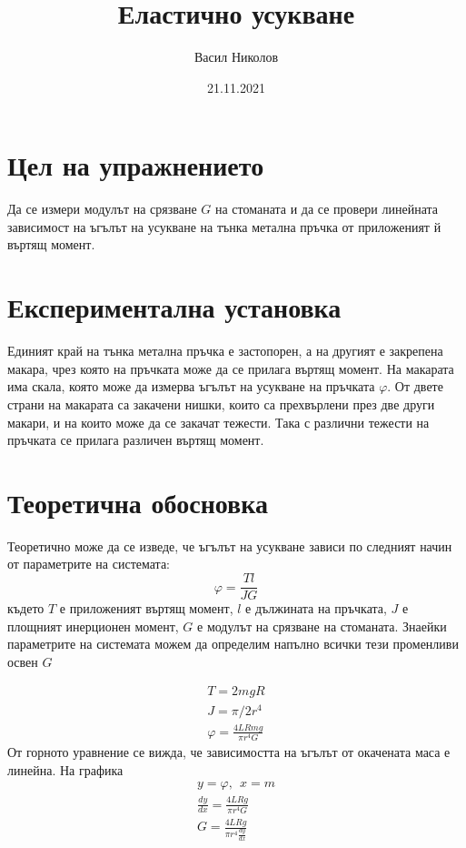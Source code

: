 \documentclass[aps, prb, twocolumn, a4paper, floatfix, reprint]{revtex4-2}
\let\phi\varphi
\begin{document}
\title{Еластично усукване}
\author{Васил Николов}
\noaffiliation
\date{21.11.2021}
\maketitle

\section{Цел на упражнението}
Да се измери модулът на срязване $G$ на стоманата и да се провери линейната зависимост на ъгълът на усукване на тънка метална пръчка от приложеният й въртящ момент.

\section{Експериментална установка}
Единият край на тънка метална пръчка е застопорен, а на другият е закрепена макара, чрез която на пръчката може да се прилага въртящ момент. На макарата има скала, която може да измерва ъгълът на усукване на пръчката $\phi$. От двете страни на макарата са закачени нишки, които са прехвърлени през две други макари, и на които може да се закачат тежести. Така с различни тежести на пръчката се прилага различен въртящ момент.

\section{Теоретична обосновка}
Теоретично може да се изведе, че ъгълът на усукване зависи по следният начин от параметрите на системата:
\begin{equation*}
    \phi=\frac{Tl}{JG}
\end{equation*}
където $T$ е приложеният въртящ момент, $l$ е дължината на пръчката, $J$ е площният инерционен момент, $G$ е модулът на срязване на стоманата. Знаейки параметрите на системата можем да определим напълно всички тези променливи освен $G$

\begin{gather*}
    T=2mgR \\
    J=\pi/2 r^4 \\
    \phi = \frac{4LRmg}{\pi r^4 G} \label{eq:1} \tag{1}
\end{gather*}
От горното уравнение се вижда, че зависимостта на ъгълът от окачената маса е линейна. На графика
\begin{gather*}
    y=\phi , \ \ x=m \\
    \frac{dy}{dx} = \frac{4LRg}{\pi r^4 G} \\
    G = \frac{4LRg}{\pi r^4 \frac{dy}{dx}} \label{eq:2} \tag{2} 
\end{gather*}
\end{document}
